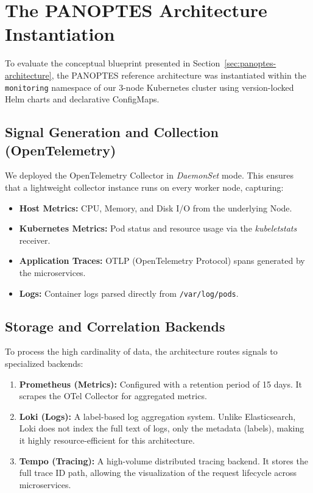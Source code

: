 \section{The PANOPTES Architecture Instantiation}
\label{sec:panoptes-instantiation}

To evaluate the conceptual blueprint presented in Section~\ref{sec:panoptes-architecture}, the PANOPTES reference architecture was instantiated within the \texttt{monitoring} namespace of our 3-node Kubernetes cluster using version-locked Helm charts and declarative ConfigMaps.

\subsection{Signal Generation and Collection (OpenTelemetry)}
We deployed the OpenTelemetry Collector in \textit{DaemonSet} mode. This ensures that a lightweight collector instance runs on every worker node, capturing:
\begin{itemize}
    \item \textbf{Host Metrics:} CPU, Memory, and Disk I/O from the underlying Node.
    \item \textbf{Kubernetes Metrics:} Pod status and resource usage via the \textit{kubeletstats} receiver.
    \item \textbf{Application Traces:} OTLP (OpenTelemetry Protocol) spans generated by the microservices.
    \item \textbf{Logs:} Container logs parsed directly from \texttt{/var/log/pods}.
\end{itemize}

\subsection{Storage and Correlation Backends}
To process the high cardinality of data, the architecture routes signals to specialized backends:
\begin{enumerate}
    \item \textbf{Prometheus (Metrics):} Configured with a retention period of 15 days. It scrapes the OTel Collector for aggregated metrics.
    \item \textbf{Loki (Logs):} A label-based log aggregation system. Unlike Elasticsearch, Loki does not index the full text of logs, only the metadata (labels), making it highly resource-efficient for this architecture.
    \item \textbf{Tempo (Tracing):} A high-volume distributed tracing backend. It stores the full trace ID path, allowing the visualization of the request lifecycle across microservices.
\end{enumerate}


